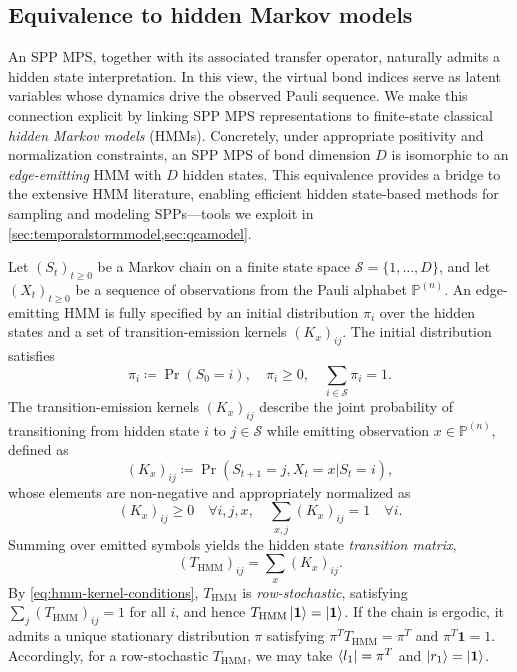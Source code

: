 \documentclass[
    aps,
    prx,
    reprint,
    superscriptaddress,
    longbibliography,
    nofootinbib,
    floatfix,
]{revtex4-2}
\begin{document}
\subsection{Equivalence to hidden Markov models}
An SPP MPS, together with its associated transfer operator, naturally admits a hidden state interpretation. In this view, the virtual bond indices serve as latent variables whose dynamics drive the observed Pauli sequence. We make this connection explicit by linking SPP MPS representations to finite-state classical \emph{hidden Markov models} (HMMs). Concretely, under appropriate positivity and normalization constraints, an SPP MPS of bond dimension \(D\) is isomorphic to an \emph{edge-emitting} HMM with \(D\) hidden states. This equivalence provides a bridge to the extensive HMM literature, enabling efficient hidden state-based methods for sampling and modeling SPPs---tools we exploit in \cref{sec:temporalstormmodel,sec:qcamodel}.

Let \((S_t)_{t\geq 0}\) be a Markov chain on a finite state space \(\mathcal{S}=\{1,\dots,D\}\), and let \((X_t)_{t\geq 0}\) be a sequence of observations from the Pauli alphabet \(\mathbb{P}^{(n)}\). An edge-emitting HMM is fully specified by an initial distribution \(\pi_i\) over the hidden states and a set of transition-emission kernels \((K_x)_{ij}\). The initial distribution satisfies
\begin{equation}
    \pi_i \coloneq \Pr(S_0=i), 
    \quad 
    \pi_i \ge 0,\quad \sum_{i\in\mathcal S}\pi_i = 1.
\end{equation}
The transition-emission kernels \((K_x)_{ij}\) describe the joint probability of transitioning from hidden state \(i\) to \(j \in \mathcal{S}\) while emitting observation \(x \in \mathbb{P}^{(n)}\), defined as
\begin{equation}
    (K_x)_{ij} \coloneq \Pr{(S_{t+1}=j, X_t = x | S_t = i)},
\end{equation}
whose elements are non-negative and appropriately normalized as
\begin{equation}\label{eq:hmm-kernel-conditions}
    (K_x)_{ij} \geq 0 \quad \forall i,j,x,
    \quad
    \sum_{x,j} (K_x)_{ij} = 1 \quad \forall i.
\end{equation}
Summing over emitted symbols yields the hidden state \emph{transition matrix},
\begin{equation}
    (T_{\mathrm{HMM}})_{ij} = \sum_{x} (K_x)_{ij}.
\end{equation}
By \cref{eq:hmm-kernel-conditions}, \(T_{\mathrm{HMM}}\) is \emph{row-stochastic}, satisfying \(\sum_j (T_{\mathrm{HMM}})_{ij} = 1\) for all \(i\), and hence \(T_{\mathrm{HMM}}\ket{\mathbf{1}} = \ket{\mathbf{1}}\). If the chain is ergodic, it admits a unique stationary distribution \(\pi\) satisfying \(\pi^T T_{\mathrm{HMM}} = \pi^T\) and \(\pi^T\mathbf{1} = 1\). Accordingly, for a row-stochastic \(T_{\mathrm{HMM}}\), we may take \(\bra{l_1} = \pi^T\) and \(\ket{r_1} = \ket{\mathbf{1}}\).
\end{document}
